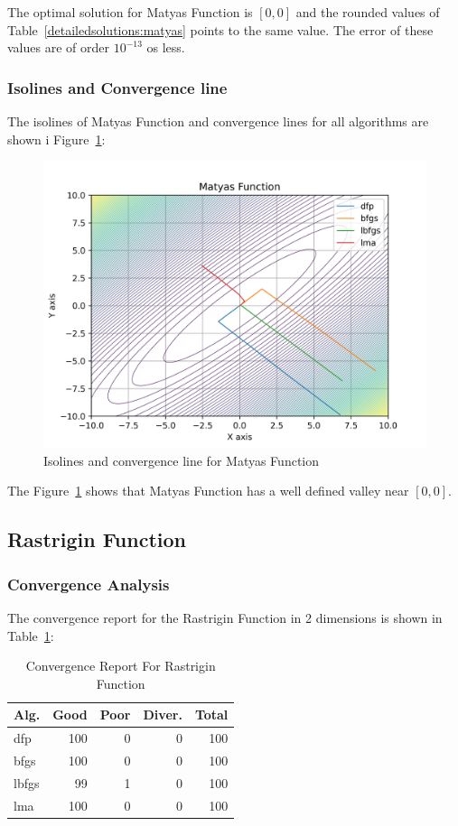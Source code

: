 \documentclass[conference]{IEEEtran}
\begin{document}
The optimal solution for Matyas Function is $\left[0, 0\right]$ and the rounded values
of Table~\ref{detailedsolutions:matyas} points to the same value. The error of
these values are of order $10^{-13}$ os less.
\subsubsection{Isolines and Convergence line}
\label{isolinesmatyas2D}

The isolines of Matyas Function and convergence lines for all algorithms are shown i Figure~\ref{fig:matyas}:\begin{figure}[H]
\centering
\caption{Isolines and convergence line for Matyas Function}
\label{fig:matyas}
\includegraphics[scale=0.5]{images/matyas.jpg}
\end{figure}
The Figure~\ref{fig:matyas} shows that Matyas Function has a well defined valley near $[0, 0]$. \subsection{Rastrigin Function}
\label{rastrigin2d2D}

\subsubsection{Convergence Analysis}
\label{convergencerastrigin2d2D}


The convergence report for the Rastrigin Function in 2 dimensions is shown in Table~\ref{convergence:rastrigin2d}:

\begin{table}[H]
\centering
\caption{Convergence Report For Rastrigin Function}
\label{convergence:rastrigin2d}
\begin{tabular}{lrrrr}
\toprule
 Alg. &  Good &  Poor &  Diver. &  Total \\
\midrule
  dfp &   100 &     0 &       0 &    100 \\
 bfgs &   100 &     0 &       0 &    100 \\
lbfgs &    99 &     1 &       0 &    100 \\
  lma &   100 &     0 &       0 &    100 \\
\bottomrule
\end{tabular}
\end{table}
\end{document}
